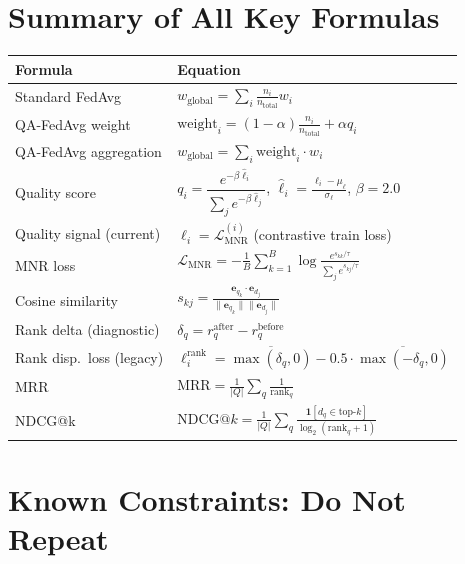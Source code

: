 \documentclass[12pt,a4paper]{article}
\begin{document}
\section{Summary of All Key Formulas}

\begin{center}
\renewcommand{\arraystretch}{2.2}
\begin{tabularx}{\textwidth}{lX}
\toprule
\textbf{Formula} & \textbf{Equation} \\
\midrule
Standard FedAvg & $w_{\text{global}} = \sum_i \frac{n_i}{n_{\text{total}}} w_i$ \\
QA-FedAvg weight & $\text{weight}_i = (1-\alpha)\frac{n_i}{n_{\text{total}}} + \alpha q_i$ \\
QA-FedAvg aggregation & $w_{\text{global}} = \sum_i \text{weight}_i \cdot w_i$ \\
Quality score & $q_i = \dfrac{e^{-\beta \hat{\ell}_i}}{\sum_j e^{-\beta \hat{\ell}_j}}$, \quad $\hat{\ell}_i = \frac{\ell_i - \mu_\ell}{\sigma_\ell}$, \quad $\beta = 2.0$ \\
Quality signal (current) & $\ell_i = \mathcal{L}_{\text{MNR}}^{(i)}$ (contrastive train loss) \\
MNR loss & $\mathcal{L}_{\text{MNR}} = -\frac{1}{B}\sum_{k=1}^{B} \log \frac{e^{s_{kk}/\tau}}{\sum_j e^{s_{kj}/\tau}}$ \\
Cosine similarity & $s_{kj} = \frac{\mathbf{e}_{q_k} \cdot \mathbf{e}_{d_j}}{\|\mathbf{e}_{q_k}\|\|\mathbf{e}_{d_j}\|}$ \\
Rank delta (diagnostic) & $\delta_q = r_q^{\text{after}} - r_q^{\text{before}}$ \\
Rank disp.\ loss (legacy) & $\ell_i^{\text{rank}} = \overline{\max(\delta_q,0)} - 0.5\cdot\overline{\max(-\delta_q,0)}$ \\
MRR & $\text{MRR} = \frac{1}{|Q|}\sum_q \frac{1}{\text{rank}_q}$ \\
NDCG@k & $\text{NDCG}@k = \frac{1}{|Q|}\sum_q \frac{\mathbf{1}[d_q \in \text{top-}k]}{\log_2(\text{rank}_q+1)}$ \\
\bottomrule
\end{tabularx}
\end{center}

\section{Known Constraints: Do Not Repeat}
\end{document}
